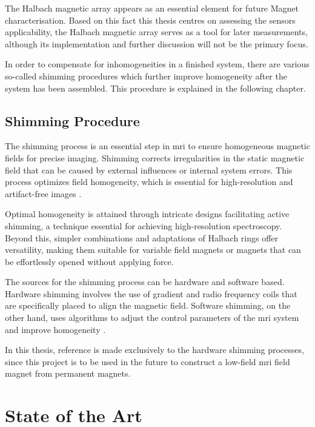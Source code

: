 The Halbach magnetic array appears as an essential element for future
Magnet characterisation. Based on this fact this thesis centres on
assessing the sensors applicability, the Halbach magnetic array serves
as a tool for later measurements, although its implementation and
further discussion will not be the primary focus.

In order to compensate for inhomogeneities in a finished system, there
are various so-called shimming procedures which further improve
homogeneity after the system has been assembled. This procedure is
explained in the following chapter.

\hypertarget{shimming-procedure}{%
\subsection{Shimming Procedure}\label{shimming-procedure}}

The shimming process is an essential step in \gls{mri} to ensure
homogeneous magnetic fields for precise imaging. Shimming corrects
irregularities in the static magnetic field that can be caused by
external influences or internal system errors. This process optimizes
field homogeneity, which is essential for high-resolution and
artifact-free images .

Optimal homogeneity is attained through intricate designs facilitating
active shimming, a technique essential for achieving high-resolution
spectroscopy. Beyond this, simpler combinations and adaptations of
Halbach rings offer versatility, making them suitable for variable field
magnets or magnets that can be effortlessly opened without applying
force. 

The sources for the shimming process can be hardware and software based.
Hardware shimming involves the use of gradient and radio frequency coils
that are specifically placed to align the magnetic field.
 Software shimming, on the other hand, uses algorithms
to adjust the control parameters of the \gls{mri} system and improve
homogeneity .

In this thesis, reference is made exclusively to the hardware shimming
processes, since this project is to be used in the future to construct a
low-field \gls{mri} field magnet from permanent magnets.

\hypertarget{state-of-the-art}{%
\section{State of the Art}\label{state-of-the-art}}

